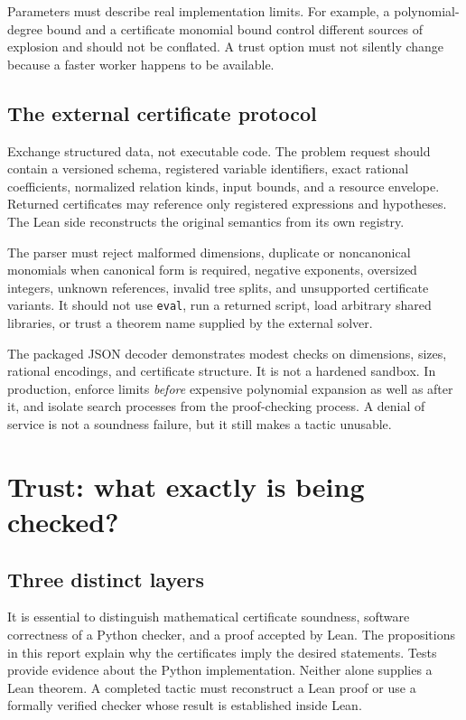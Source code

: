 \documentclass[11pt,a4paper]{article}
\theoremstyle{definition}
\newcommand{\code}[1]{\texttt{#1}}
\begin{document}
Parameters must describe real implementation limits. For example, a polynomial-degree bound and a certificate monomial bound control different sources of explosion and should not be conflated. A trust option must not silently change because a faster worker happens to be available.

\subsection{The external certificate protocol}

Exchange structured data, not executable code. The problem request should contain a versioned schema, registered variable identifiers, exact rational coefficients, normalized relation kinds, input bounds, and a resource envelope. Returned certificates may reference only registered expressions and hypotheses. The Lean side reconstructs the original semantics from its own registry.

The parser must reject malformed dimensions, duplicate or noncanonical monomials when canonical form is required, negative exponents, oversized integers, unknown references, invalid tree splits, and unsupported certificate variants. It should not use \code{eval}, run a returned script, load arbitrary shared libraries, or trust a theorem name supplied by the external solver.

The packaged JSON decoder demonstrates modest checks on dimensions, sizes, rational encodings, and certificate structure. It is not a hardened sandbox. In production, enforce limits \emph{before} expensive polynomial expansion as well as after it, and isolate search processes from the proof-checking process. A denial of service is not a soundness failure, but it still makes a tactic unusable.

\section{Trust: what exactly is being checked?}

\subsection{Three distinct layers}

It is essential to distinguish mathematical certificate soundness, software correctness of a Python checker, and a proof accepted by Lean. The propositions in this report explain why the certificates imply the desired statements. Tests provide evidence about the Python implementation. Neither alone supplies a Lean theorem. A completed tactic must reconstruct a Lean proof or use a formally verified checker whose result is established inside Lean.
\end{document}
